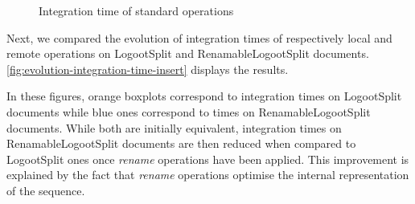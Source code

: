 \documentclass[10pt,journal,compsoc]{IEEEtran}
\let\MYoriglatexcaption\caption
\renewcommand{\caption}[2][\relax]{\MYoriglatexcaption[#2]{#2}}
\begin{document}
\begin{figure}[t!]
    \centering
    \hfil
    \caption{Integration time of standard operations}
    \label{fig:evolution-integration-time-insert}
\end{figure}

Next, we compared the evolution of integration times of respectively local and remote operations on LogootSplit and RenamableLogootSplit documents.
\autoref{fig:evolution-integration-time-insert} displays the results.

In these figures, orange boxplots correspond to integration times on LogootSplit documents while blue ones correspond to times on RenamableLogootSplit documents.
While both are initially equivalent, integration times on RenamableLogootSplit documents are then reduced when compared to LogootSplit ones once \emph{rename} operations have been applied.
This improvement is explained by the fact that \emph{rename} operations optimise the internal representation of the sequence.
\end{document}
